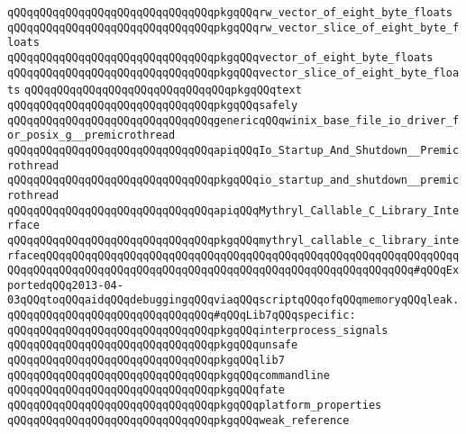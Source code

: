 \verb|qQQqqQQqqQQqqQQqqQQqqQQqqQQqqQQqpkgqQQqrw_vector_of_eight_byte_floats|\newline
\verb|qQQqqQQqqQQqqQQqqQQqqQQqqQQqqQQqpkgqQQqrw_vector_slice_of_eight_byte_floats|\newline
\verb|qQQqqQQqqQQqqQQqqQQqqQQqqQQqqQQqpkgqQQqvector_of_eight_byte_floats|\newline
\verb|qQQqqQQqqQQqqQQqqQQqqQQqqQQqqQQqpkgqQQqvector_slice_of_eight_byte_floats|\newline
\verb|qQQqqQQqqQQqqQQqqQQqqQQqqQQqqQQqpkgqQQqtext|\newline
\verb|qQQqqQQqqQQqqQQqqQQqqQQqqQQqqQQqpkgqQQqsafely|\newline
\newline
\verb|qQQqqQQqqQQqqQQqqQQqqQQqqQQqqQQqgenericqQQqwinix_base_file_io_driver_for_posix_g__premicrothread|\newline
\newline
\verb|qQQqqQQqqQQqqQQqqQQqqQQqqQQqqQQqapiqQQqIo_Startup_And_Shutdown__Premicrothread|\newline
\verb|qQQqqQQqqQQqqQQqqQQqqQQqqQQqqQQqpkgqQQqio_startup_and_shutdown__premicrothread|\newline
\newline
\verb|qQQqqQQqqQQqqQQqqQQqqQQqqQQqqQQqapiqQQqMythryl_Callable_C_Library_Interface|\newline
\verb|qQQqqQQqqQQqqQQqqQQqqQQqqQQqqQQqpkgqQQqmythryl_callable_c_library_interfaceqQQqqQQqqQQqqQQqqQQqqQQqqQQqqQQqqQQqqQQqqQQqqQQqqQQqqQQqqQQqqQQqqQQqqQQqqQQqqQQqqQQqqQQqqQQqqQQqqQQqqQQqqQQqqQQqqQQqqQQqqQQqqQQq#qQQqExportedqQQq2013-04-03qQQqtoqQQqaidqQQqdebuggingqQQqviaqQQqscriptqQQqofqQQqmemoryqQQqleak.|\newline
\newline
\verb|qQQqqQQqqQQqqQQqqQQqqQQqqQQqqQQq#qQQqLib7qQQqspecific:|\newline
\verb|qQQqqQQqqQQqqQQqqQQqqQQqqQQqqQQqpkgqQQqinterprocess_signals|\newline
\verb|qQQqqQQqqQQqqQQqqQQqqQQqqQQqqQQqpkgqQQqunsafe|\newline
\verb|qQQqqQQqqQQqqQQqqQQqqQQqqQQqqQQqpkgqQQqlib7|\newline
\verb|qQQqqQQqqQQqqQQqqQQqqQQqqQQqqQQqpkgqQQqcommandline|\newline
\verb|qQQqqQQqqQQqqQQqqQQqqQQqqQQqqQQqpkgqQQqfate|\newline
\verb|qQQqqQQqqQQqqQQqqQQqqQQqqQQqqQQqpkgqQQqplatform_properties|\newline
\verb|qQQqqQQqqQQqqQQqqQQqqQQqqQQqqQQqpkgqQQqweak_reference|\newline
